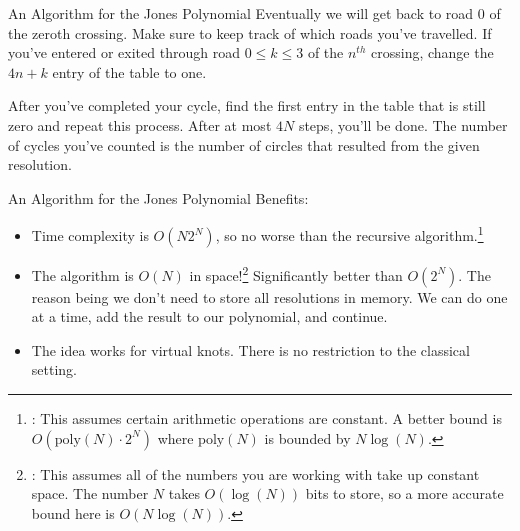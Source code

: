 \documentclass{beamer}
\begin{document}
    \begin{frame}{An Algorithm for the Jones Polynomial}
        Eventually we will get back to road 0 of the zeroth crossing.
        Make sure to keep track of which roads you've travelled. If you've
        entered or exited through road $0\leq{k}\leq{3}$ of the $n^{th}$
        crossing, change the $4n+k$ entry of the table to one.
        \par\hfill\par
        After you've completed your cycle, find the first entry in the table
        that is still zero and repeat this process. After at most $4N$ steps,
        you'll be done. The number of cycles you've counted is the number of
        circles that resulted from the given resolution.
    \end{frame}
    \begin{frame}{An Algorithm for the Jones Polynomial}
        Benefits:
        \begin{itemize}
            \item
                Time complexity is $O(N2^{N})$, so no worse than the
                recursive algorithm.\footnote{%
                    \textbf{\color{red}{Correction}}:
                    This assumes certain arithmetic operations are constant.
                    A better bound is $O(\textrm{poly}(N)\cdot{2}^{N})$ where
                    $\textrm{poly}(N)$ is bounded by $N\log(N)$.
                }
            \item
                The algorithm is $O(N)$ in space!\footnote{%
                    \textbf{\color{red}{Correction}}:
                    This assumes all of the numbers you are working with take
                    up constant space. The number $N$ takes $O(\log(N))$
                    bits to store, so a more accurate bound here is
                    $O(N\log(N))$.
                }
                Significantly better than
                $O(2^{N})$. The reason being we don't need to store all
                resolutions in memory. We can do one at a time, add the
                result to our polynomial, and continue.
            \item The idea works for virtual knots. There is no restriction to
                  the classical setting.
        \end{itemize}
    \end{frame}
\end{document}
